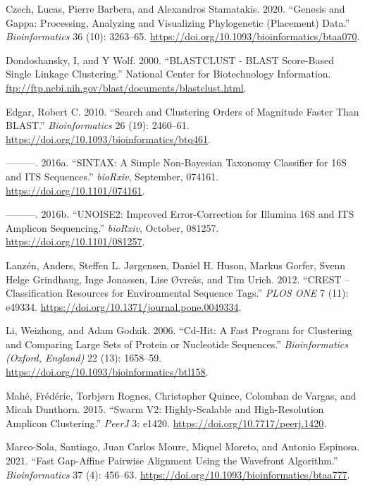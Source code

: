 \documentclass[
]{article}
\newlength{\cslhangindent}
\newenvironment{CSLReferences}[2] %
 {\begin{list}{}{%
  \setlength{\itemindent}{0pt}
  \setlength{\leftmargin}{0pt}
  \setlength{\parsep}{0pt}
  \ifodd #1
   \setlength{\leftmargin}{\cslhangindent}
   \setlength{\itemindent}{-1\cslhangindent}
  \fi
  \setlength{\itemsep}{#2\baselineskip}}}
 {\end{list}}
\begin{document}
\begin{CSLReferences}{1}{0}
Czech, Lucas, Pierre Barbera, and Alexandros Stamatakis. 2020. {``Genesis and {Gappa}: Processing, Analyzing and Visualizing Phylogenetic (Placement) Data.''} \emph{Bioinformatics} 36 (10): 3263--65. \url{https://doi.org/10.1093/bioinformatics/btaa070}.

Dondoshansky, I, and Y Wolf. 2000. {``{BLASTCLUST} - {BLAST} Score-Based Single Linkage Clustering.''} National Center for Biotechnology Information. \url{ftp://ftp.ncbi.nih.gov/blast/documents/blastclust.html}.

Edgar, Robert C. 2010. {``Search and Clustering Orders of Magnitude Faster Than {BLAST}.''} \emph{Bioinformatics} 26 (19): 2460--61. \url{https://doi.org/10.1093/bioinformatics/btq461}.

---------. 2016a. {``{SINTAX}: A Simple Non-{Bayesian} Taxonomy Classifier for {16S} and {ITS} Sequences.''} \emph{bioRxiv}, September, 074161. \url{https://doi.org/10.1101/074161}.

---------. 2016b. {``{UNOISE2}: Improved Error-Correction for {Illumina 16S} and {ITS} Amplicon Sequencing.''} \emph{bioRxiv}, October, 081257. \url{https://doi.org/10.1101/081257}.

Lanzén, Anders, Steffen L. Jørgensen, Daniel H. Huson, Markus Gorfer, Svenn Helge Grindhaug, Inge Jonassen, Lise Øvreås, and Tim Urich. 2012. {``{CREST} -- {Classification Resources} for {Environmental Sequence Tags}.''} \emph{PLOS ONE} 7 (11): e49334. \url{https://doi.org/10.1371/journal.pone.0049334}.

Li, Weizhong, and Adam Godzik. 2006. {``Cd-Hit: A Fast Program for Clustering and Comparing Large Sets of Protein or Nucleotide Sequences.''} \emph{Bioinformatics (Oxford, England)} 22 (13): 1658--59. \url{https://doi.org/10.1093/bioinformatics/btl158}.

Mahé, Frédéric, Torbjørn Rognes, Christopher Quince, Colomban de Vargas, and Micah Dunthorn. 2015. {``Swarm V2: Highly-Scalable and High-Resolution Amplicon Clustering.''} \emph{PeerJ} 3: e1420. \url{https://doi.org/10.7717/peerj.1420}.

Marco-Sola, Santiago, Juan Carlos Moure, Miquel Moreto, and Antonio Espinosa. 2021. {``Fast Gap-Affine Pairwise Alignment Using the Wavefront Algorithm.''} \emph{Bioinformatics} 37 (4): 456--63. \url{https://doi.org/10.1093/bioinformatics/btaa777}.


\end{CSLReferences}
\end{document}

